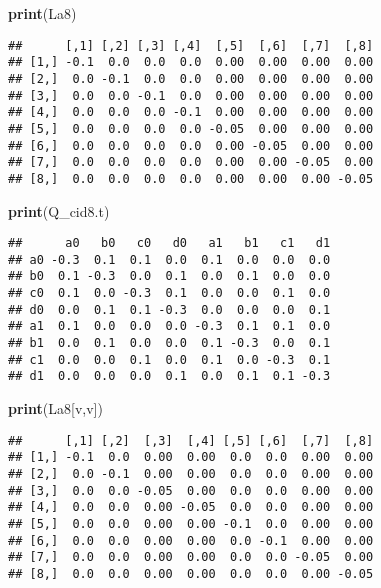 \documentclass[
]{article}
\newenvironment{Shaded}{\begin{snugshade}}{\end{snugshade}}
\newcommand{\FunctionTok}[1]{\textcolor[rgb]{0.13,0.29,0.53}{\textbf{#1}}}
\newcommand{\NormalTok}[1]{#1}
\begin{document}
\begin{Shaded}
\begin{Highlighting}[]
\FunctionTok{print}\NormalTok{(La8)}
\end{Highlighting}
\end{Shaded}

\begin{verbatim}
##      [,1] [,2] [,3] [,4]  [,5]  [,6]  [,7]  [,8]
## [1,] -0.1  0.0  0.0  0.0  0.00  0.00  0.00  0.00
## [2,]  0.0 -0.1  0.0  0.0  0.00  0.00  0.00  0.00
## [3,]  0.0  0.0 -0.1  0.0  0.00  0.00  0.00  0.00
## [4,]  0.0  0.0  0.0 -0.1  0.00  0.00  0.00  0.00
## [5,]  0.0  0.0  0.0  0.0 -0.05  0.00  0.00  0.00
## [6,]  0.0  0.0  0.0  0.0  0.00 -0.05  0.00  0.00
## [7,]  0.0  0.0  0.0  0.0  0.00  0.00 -0.05  0.00
## [8,]  0.0  0.0  0.0  0.0  0.00  0.00  0.00 -0.05
\end{verbatim}

\begin{Shaded}
\begin{Highlighting}[]
\FunctionTok{print}\NormalTok{(Q\_cid8.t)}
\end{Highlighting}
\end{Shaded}

\begin{verbatim}
##      a0   b0   c0   d0   a1   b1   c1   d1
## a0 -0.3  0.1  0.1  0.0  0.1  0.0  0.0  0.0
## b0  0.1 -0.3  0.0  0.1  0.0  0.1  0.0  0.0
## c0  0.1  0.0 -0.3  0.1  0.0  0.0  0.1  0.0
## d0  0.0  0.1  0.1 -0.3  0.0  0.0  0.0  0.1
## a1  0.1  0.0  0.0  0.0 -0.3  0.1  0.1  0.0
## b1  0.0  0.1  0.0  0.0  0.1 -0.3  0.0  0.1
## c1  0.0  0.0  0.1  0.0  0.1  0.0 -0.3  0.1
## d1  0.0  0.0  0.0  0.1  0.0  0.1  0.1 -0.3
\end{verbatim}

\begin{Shaded}
\begin{Highlighting}[]
\FunctionTok{print}\NormalTok{(La8[v,v])}
\end{Highlighting}
\end{Shaded}

\begin{verbatim}
##      [,1] [,2]  [,3]  [,4] [,5] [,6]  [,7]  [,8]
## [1,] -0.1  0.0  0.00  0.00  0.0  0.0  0.00  0.00
## [2,]  0.0 -0.1  0.00  0.00  0.0  0.0  0.00  0.00
## [3,]  0.0  0.0 -0.05  0.00  0.0  0.0  0.00  0.00
## [4,]  0.0  0.0  0.00 -0.05  0.0  0.0  0.00  0.00
## [5,]  0.0  0.0  0.00  0.00 -0.1  0.0  0.00  0.00
## [6,]  0.0  0.0  0.00  0.00  0.0 -0.1  0.00  0.00
## [7,]  0.0  0.0  0.00  0.00  0.0  0.0 -0.05  0.00
## [8,]  0.0  0.0  0.00  0.00  0.0  0.0  0.00 -0.05
\end{verbatim}
\end{document}
